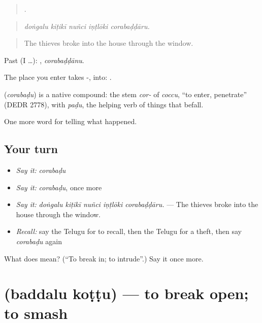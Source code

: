 \begin{quote}
    .
\end{quote}

\begin{quote}
\emph{doṅgalu kiṭikī nuñci iṇṭlōki corabaḍḍāru.}
\end{quote}

\begin{quote}
The thieves broke into the house through the window.
\end{quote}

Past (I …): , \emph{corabaḍḍānu}.

The place you enter takes -, into:  .

\begin{cousinweb}
\textbf{} (\emph{corabaḍu}) is a native compound: the stem \emph{cor-} of \emph{coccu}, \textquotedblleft{}to enter, penetrate\textquotedblright{} (DEDR 2778), with \emph{paḍu}, the helping verb of things that befall.
\end{cousinweb}

\begin{grammarlens}[title={What you've built}]
One more word for telling what happened.
\end{grammarlens}

\subsection*{Your turn}
\begin{itemize}
\raggedright
  \item \emph{Say it:} \emph{corabaḍu}
  \item \emph{Say it:} \emph{corabaḍu}, once more
  \item \emph{Say it:} \emph{doṅgalu kiṭikī nuñci iṇṭlōki corabaḍḍāru.} — The thieves broke into the house through the window.
  \item \emph{Recall:} say the Telugu for to recall, then the Telugu for a theft, then say \emph{corabaḍu} again
\end{itemize}

\begin{tcolorbox}[breakable,colback=teal!4,colframe=teal!35!black,title={Before you move on}]
What does  mean? (\textquotedblleft{}To break in; to intrude\textquotedblright{}.) Say it once more.
\end{tcolorbox}
\section[\texorpdfstring{\te{బద్దలు} \te{కొట్టు} (baddalu koṭṭu)}{బద్దలు కొట్టు (baddalu koṭṭu)}]{  (baddalu koṭṭu) — to break open; to smash}

